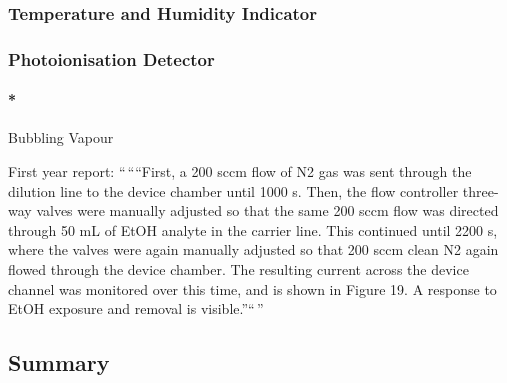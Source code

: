 \documentclass[
  letterpaper,
  DIV=11,
  numbers=noendperiod]{scrartcl}
\let\oldparagraph\paragraph
\renewcommand{\paragraph}[1]{\oldparagraph{#1}\mbox{}}
\begin{document}
\hypertarget{temperature-and-humidity-indicator}{%
\subsubsection{Temperature and Humidity
Indicator}\label{temperature-and-humidity-indicator}}

\hypertarget{photoionisation-detector}{%
\subsubsection{Photoionisation
Detector}\label{photoionisation-detector}}

\hypertarget{bubbling-vapour}{%
\paragraph*{Bubbling Vapour}\label{bubbling-vapour}}

First year report: ``\,````First, a 200 sccm flow of N2 gas was sent
through the dilution line to the device chamber until 1000 s. Then, the
flow controller three-way valves were manually adjusted so that the same
200 sccm flow was directed through 50 mL of EtOH analyte in the carrier
line. This continued until 2200 s, where the valves were again manually
adjusted so that 200 sccm clean N2 again flowed through the device
chamber. The resulting current across the device channel was monitored
over this time, and is shown in Figure 19. A response to EtOH exposure
and removal is visible.''``\,''

\hypertarget{summary}{%
\subsection{Summary}\label{summary}}
\end{document}
